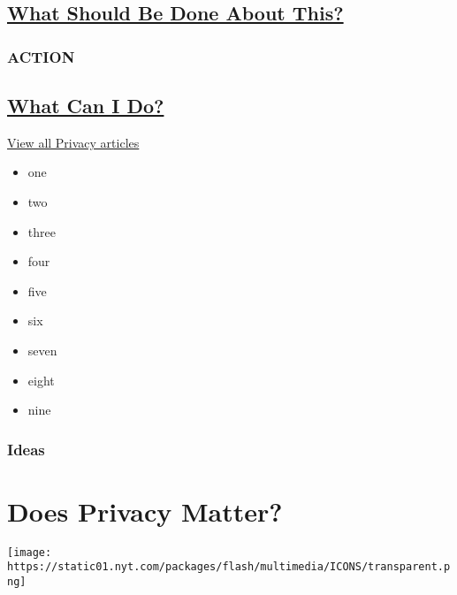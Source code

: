 \hypertarget{what-should-be-done-about-this}{%
\subsection{\texorpdfstring{\protect\hyperlink{part-three}{What Should
Be Done About
This?}}{What Should Be Done About This?}}\label{what-should-be-done-about-this}}

\hypertarget{action}{%
\subsubsection{ACTION}\label{action}}

\hypertarget{what-can-i-do}{%
\subsection{\texorpdfstring{\protect\hyperlink{part-four}{What Can I
Do?}}{What Can I Do?}}\label{what-can-i-do}}

\href{https://nytimes.com/series/new-york-times-privacy-project}{View
all Privacy articles}

\begin{itemize}
\tightlist
\item
  one
\item
  two
\item
  three
\item
  four
\item
  five
\item
  six
\item
  seven
\item
  eight
\item
  nine
\end{itemize}

\hypertarget{ideas-1}{%
\subsubsection{Ideas}\label{ideas-1}}

\hypertarget{does-privacy-matter-1}{%
\section{Does Privacy Matter?}\label{does-privacy-matter-1}}

\texttt{[image: https://static01.nyt.com/packages/flash/multimedia/ICONS/transparent.png]}

